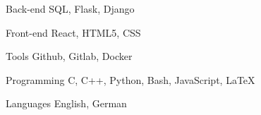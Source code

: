 

\begin{cvskills}
  
  \cvskill
    {Back-end} %
    {SQL, Flask, Django} %
  
  \cvskill
    {Front-end} %
    {React, HTML5, CSS} %
  
  \cvskill
    {Tools} %
    {Github, Gitlab, Docker} %

  \cvskill
    {Programming} %
    {C, C++, Python, Bash, JavaScript, LaTeX} %

  \cvskill
    {Languages} %
    {English, German} %

\end{cvskills}
